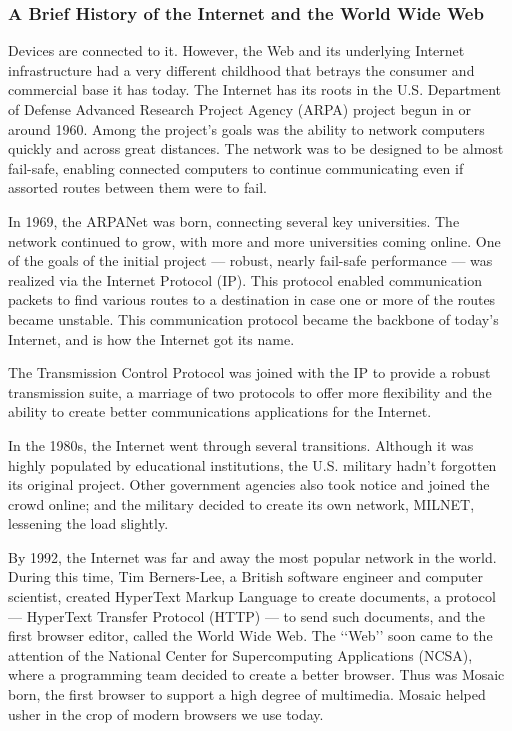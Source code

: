 \subsubsection*{A Brief History of the Internet and the World Wide Web}
Devices are connected to it. However, the Web and its underlying Internet infrastructure had a
very different childhood that betrays the consumer and commercial base it has today.
The Internet has its roots in the U.S. Department of Defense Advanced Research Project Agency
(ARPA) project begun in or around 1960. Among the project’s goals was the ability to network
computers quickly and across great distances. The network was to be designed to be almost
fail-safe, enabling connected computers to continue communicating even if assorted routes
between them were to fail.
\newline

In 1969, the ARPANet was born, connecting several key universities. The network continued
to grow, with more and more universities coming online. One of the goals of the initial
project — robust, nearly fail-safe performance — was realized via the Internet Protocol (IP).
This protocol enabled communication packets to find various routes to a destination in case one
or more of the routes became unstable. This communication protocol became the backbone of
today’s Internet, and is how the Internet got its name.
\newline

The Transmission Control Protocol was joined with the IP to provide a robust transmission suite,
a marriage of two protocols to offer more flexibility and the ability to create better communications
applications for the Internet.
\newline

In the 1980s, the Internet went through several transitions. Although it was highly populated by
educational institutions, the U.S. military hadn’t forgotten its original project. Other government
agencies also took notice and joined the crowd online; and the military decided to create its own
network, MILNET, lessening the load slightly.
\newline

By 1992, the Internet was far and away the most popular network in the world. During this
time, Tim Berners-Lee, a British software engineer and computer scientist, created HyperText
Markup Language to create documents, a protocol — HyperText Transfer Protocol (HTTP) — to send such documents, and the first browser editor, called the World Wide Web. The ‘‘Web’’ soon
came to the attention of the National Center for Supercomputing Applications (NCSA), where a
programming team decided to create a better browser. Thus was Mosaic born, the first browser
to support a high degree of multimedia. Mosaic helped usher in the crop of modern browsers we
use today.
\newline

